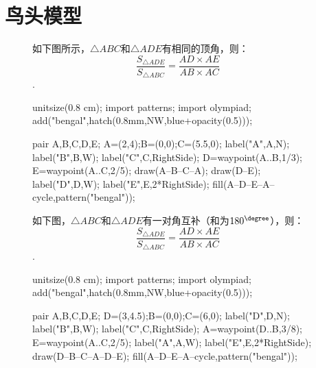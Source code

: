 \documentclass[12pt,space]{ctexart} %
\begin{document}
\section{鸟头模型}
\begin{figure}[ht]
	\begin{minipage}[b]{0.4\textwidth}
		如下图所示，$\triangle ABC$和$\triangle ADE$有相同的顶角，则：
		$$\frac{S_{\triangle ADE}}{S_{\triangle ABC}}=\frac{AD\times AE}{AB\times AC}$$.\\
		\begin{asy}
			unitsize(0.8 cm);
			import patterns;
			import olympiad;
			add("bengal",hatch(0.8mm,NW,blue+opacity(0.5)));

			pair A,B,C,D,E;
			A=(2,4);B=(0,0);C=(5.5,0);
			label("A",A,N);
			label("B",B,W);
			label("C",C,RightSide);
			D=waypoint(A..B,1/3);
			E=waypoint(A..C,2/5);
			draw(A--B--C--A);
			draw(D--E);
			label("D",D,W);
			label("E",E,2*RightSide);
			fill(A--D--E--A--cycle,pattern("bengal"));
		\end{asy}
	\end{minipage}
	\qquad
	\begin{minipage}[b]{0.45\textwidth}
		如下图，$\triangle ABC$和$\triangle ADE$有一对角互补（和为$180^{\degree}$），则：
		$$\frac{S_{\triangle ADE}}{S_{\triangle ABC}}=\frac{AD\times AE}{AB\times AC}$$.
		\begin{asy}
			unitsize(0.8 cm);
			import patterns;
			import olympiad;
			add("bengal",hatch(0.8mm,NW,blue+opacity(0.5)));

			pair A,B,C,D,E;
			D=(3,4.5);B=(0,0);C=(6,0);
			label("D",D,N);
			label("B",B,W);
			label("C",C,RightSide);
			A=waypoint(D..B,3/8);
			E=waypoint(A..C,2/5);
			label("A",A,W);
			label("E",E,2*RightSide);
			draw(D--B--C--A--D--E);
			fill(A--D--E--A--cycle,pattern("bengal"));
		\end{asy}
	\end{minipage}
\end{figure}
\vspace{1cm}
\end{document}
